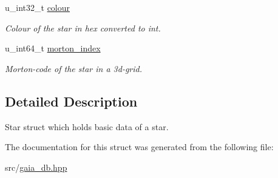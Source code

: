 \begin{DoxyCompactItemize}
\mbox{\label{struct__star_a1d9d46186ac4cb48396d3f4f4126eb80}} 
u\+\_\+int32\+\_\+t \mbox{\hyperlink{struct__star_a1d9d46186ac4cb48396d3f4f4126eb80}{colour}}
\begin{DoxyCompactList}\small\item\em Colour of the star in hex converted to int. \end{DoxyCompactList}\item 
\mbox{\label{struct__star_ada0104a0c6633bf55193b3d6e55e6b3c}} 
u\+\_\+int64\+\_\+t \mbox{\hyperlink{struct__star_ada0104a0c6633bf55193b3d6e55e6b3c}{morton\+\_\+index}}
\begin{DoxyCompactList}\small\item\em Morton-\/code of the star in a 3d-\/grid. \end{DoxyCompactList}\end{DoxyCompactItemize}


\subsection{Detailed Description}
Star struct which holds basic data of a star. 

The documentation for this struct was generated from the following file\+:\begin{DoxyCompactItemize}
\item 
src/\mbox{\hyperlink{gaia__db_8hpp}{gaia\+\_\+db.\+hpp}}\end{DoxyCompactItemize}
